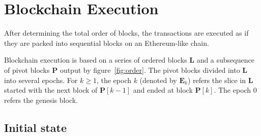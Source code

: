 

\section{Blockchain Execution}

After determining the total order of blocks, the transactions are executed as if they are packed into sequential blocks on an Ethereum-like chain. 

Blockchain execution is based on a series of ordered blocks $\mathbf{L}$ and a subsequence of pivot blocks $\mathbf{P}$ output by figure~\ref{fig:order}. 
%
The pivot blocks divided into $\mathbf{L}$ into several epochs.  For $k\ge 1$, the epoch $k$ (denoted by $\mathbf{E}_k$) refers the slice in $\mathbf{L}$ started with the next block of $\mathbf{P}[k-1]$ and ended at block $\mathbf{P}[k]$. The epoch 0 refers the genesis block. 


\subsection{Initial state}





